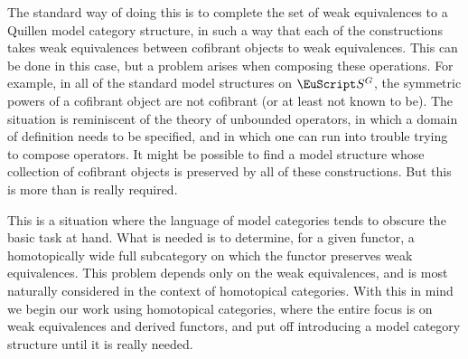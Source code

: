 \documentclass{amsart}
\theoremstyle{definition}
\theoremstyle{remark}
\newcommand{\spectra}{\EuScript S}
\newcommand{\ugspectra}[1]{\spectra^{#1}}
\begin{document}
The standard way of doing this is to complete the set of weak
equivalences to a Quillen model category structure, in such a way that
each of the constructions takes weak equivalences between cofibrant
objects to weak equivalences.  This can be done in this case, but a
problem arises when composing these operations.  For example, in all
of the standard model structures on $\ugspectra{G}$, the symmetric
powers of a cofibrant object are not cofibrant (or at least not known
to be).  The situation is reminiscent of the theory of unbounded
operators, in which a domain of definition needs to be specified, and
in which one can run into trouble trying to compose operators.  It
might be possible to find a model structure whose collection of
cofibrant objects is preserved by all of these constructions.  But
this is more than is really required.

This is a situation where the language of model categories tends to
obscure the basic task at hand.  What is needed is to determine, for a
given functor, a homotopically wide full subcategory on which the
functor preserves weak equivalences.  This problem depends only on the
weak equivalences, and is most naturally considered in the context of
homotopical categories.  With this in mind we begin our work using
homotopical categories, where the entire focus is on weak equivalences
and derived functors, and put off introducing a model category
structure until it is really needed.
\end{document}
